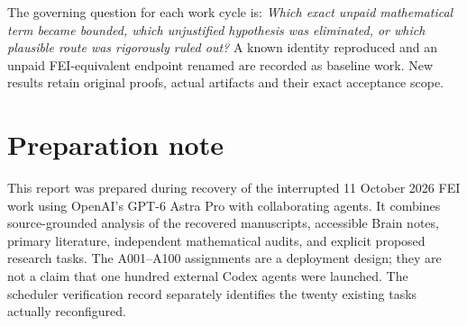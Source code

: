 \documentclass[11pt]{article}
\begin{document}
The governing question for each work cycle is:
\emph{Which exact unpaid mathematical term became bounded, which
unjustified hypothesis was eliminated, or which plausible route
was rigorously ruled out?} A known identity reproduced and an
unpaid FEI-equivalent endpoint renamed are recorded as baseline
work. New results retain original proofs, actual artifacts and
their exact acceptance scope.

\section*{Preparation note}
This report was prepared during recovery of the interrupted 11 October 2026 FEI work using OpenAI's GPT-6 Astra Pro with collaborating agents. It combines source-grounded analysis of the recovered manuscripts, accessible Brain notes, primary literature, independent mathematical audits, and explicit proposed research tasks. The A001--A100 assignments are a deployment design; they are not a claim that one hundred external Codex agents were launched. The scheduler verification record separately identifies the twenty existing tasks actually reconfigured.
\end{document}

